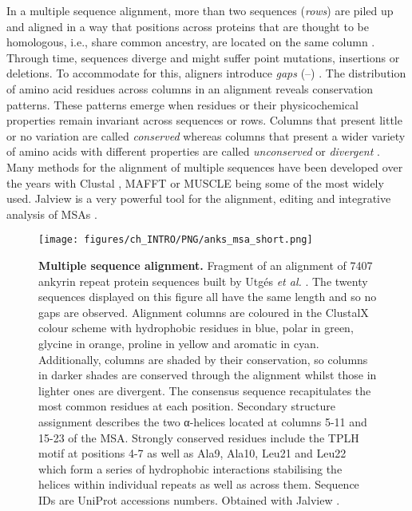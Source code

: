 In a multiple sequence alignment, more than two sequences (\textit{rows}) are piled up and aligned in a way that positions across proteins that are thought to be homologous, i.e., share common ancestry, are located on the same column \cite{NEEDLEMAN_1970_MSA}. Through time, sequences diverge and might suffer point mutations, insertions or deletions. To accommodate for this, aligners introduce \textit{gaps} (--) \cite{SMITH_1981_MSA}. The distribution of amino acid residues across columns in an alignment reveals conservation patterns. These patterns emerge when residues or their physicochemical properties remain invariant across sequences or rows. Columns that present little or no variation are called \textit{conserved} whereas columns that present a wider variety of amino acids with different properties are called \textit{unconserved} or \textit{divergent} \cite{LIVINGSTONE_1993_CONS}. Many methods for the alignment of multiple sequences have been developed over the years with Clustal \cite{HIGGINS_1988_CLUSTAL, HIGGINS_1992_CLUSTALV, THOMPSON_1994_CLUSTALW, JEANMOUGIN_1998_CLUSTALX, SIEVERS_2011_CLUSTALO}, MAFFT \cite{KATOH_2002_MAFFT, KATOH_2008_MAFFT, KATOH_2013_MAFFT} or MUSCLE \cite{EDGAR_2004_MUSCLE, EDGAR_2022_MUSCLE5} being some of the most widely used. Jalview is a very powerful tool for the alignment, editing and integrative analysis of MSAs \cite{WATERHOUSE_2009_JALVIEW}.

\begin{figure}[htb!]
    \centering
    \texttt{[image: figures/ch\_INTRO/PNG/anks\_msa\_short.png]}
    \caption[Multiple sequence alignment]{\textbf{Multiple sequence alignment.} Fragment of an alignment of 7407 ankyrin repeat protein sequences built by Utgés \textit{et al.} \cite{UTGES_2021_ANKS}. The twenty sequences displayed on this figure all have the same length and so no gaps are observed. Alignment columns are coloured in the ClustalX colour scheme \cite{JEANMOUGIN_1998_CLUSTALX} with hydrophobic residues in blue, polar in green, glycine in orange, proline in yellow and aromatic in cyan. Additionally, columns are shaded by their conservation, so columns in darker shades are conserved through the alignment whilst those in lighter ones are divergent. The consensus sequence recapitulates the most common residues at each position. Secondary structure assignment describes the two α-helices located at columns 5-11 and 15-23 of the MSA. Strongly conserved residues include the TPLH motif at positions 4-7 as well as Ala9, Ala10, Leu21 and Leu22 which form a series of hydrophobic interactions stabilising the helices within individual repeats as well as across them. Sequence IDs are UniProt accessions numbers. Obtained with Jalview \cite{WATERHOUSE_2009_JALVIEW}.}
    \label{fig:MSA}
\end{figure}


